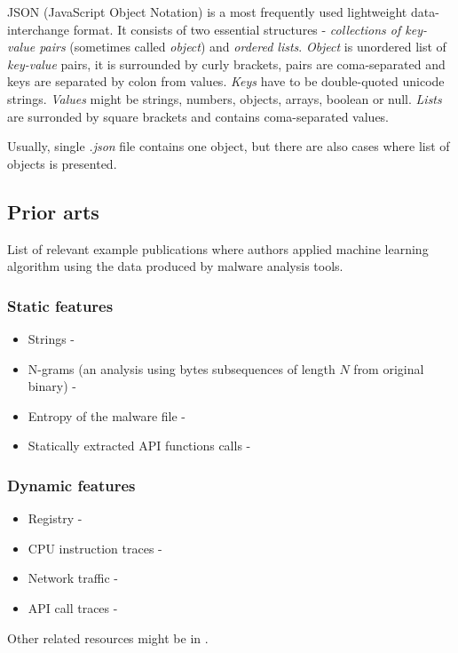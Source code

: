 JSON (JavaScript Object Notation) is a most frequently used lightweight data-interchange format. It consists of two essential structures - \emph{collections of key-value pairs} (sometimes called \emph{object}) and \emph{ordered lists}. 
\emph{Object} is unordered list of \emph{key-value} pairs, it is surrounded by curly brackets, pairs are coma-separated and keys are separated by colon from values. \emph{Keys} have to be double-quoted unicode strings. \emph{Values} might be strings, numbers, objects, arrays, boolean or null. \emph{Lists} are surronded by square brackets and contains coma-separated values.

Usually, single \emph{.json} file contains one object, but there are also cases where list of objects is presented.

\subsection{Prior arts}
List of relevant example publications where authors applied machine learning algorithm using the data produced by malware analysis tools.
\subsubsection{Static features}
\begin{itemize}
  \item Strings - \cite{Lee2011}
  \item N-grams (an analysis using bytes subsequences of length $N$ from original binary) - \cite{Fuyong2017}
  \item Entropy of the malware file - \cite{Wojnowicz2018}
  \item Statically extracted API functions calls - \cite{Ahmadi2016}
\end{itemize}

\subsubsection{Dynamic features}
\begin{itemize}
  \item Registry - \cite{Ghiasi2015}
  \item CPU instruction traces - \cite{Carlin2017}
  \item Network traffic - \cite{Boukhtouta2015}
  \item API call traces -  \cite{Galal2015}
\end{itemize}

Other related resources might be in \cite{Singh2020, Sethi2019, Abdessadki2019, Gibert2020}.



